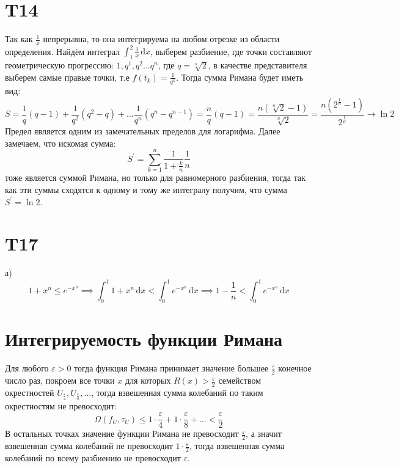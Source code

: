 \documentclass[12pt]{article}
\begin{document}
\section{T14}
Так как $\frac{1}{x}$ непрерывна, то она интегрируема на любом отрезке из области определения. 
Найдём интеграл $\int_{1}^{2} \frac{1}{x} \,\mathrm{d}x$, выберем разбиение, где точки 
составляют геометрическую прогрессию: $1, q^1, q^2 \dots q^n$, где $q = \sqrt[n]{2}$, 
в качестве представителя выберем самые правые точки, т.е $f(t_k) = \frac{1}{q^k}$. 
Тогда сумма Римана будет иметь вид: 
\[
    S = \frac{1}{q}(q - 1) + \frac{1}{q^2}(q^2 - q) + \dots \frac{1}{q^n}(q^n - q^{n-1}) = 
    \frac{n}{q}(q - 1) = \frac{n(\sqrt[n]{2} - 1)}{\sqrt[n]{2}} = \frac{n( 2^{\frac{1}{n}} - 1) }{2^{\frac{1}{n}}} \to \ln 2
\]   
Предел является одним из замечательных пределов для логарифма. Далее замечаем, что искомая сумма: 
\[
    S^{\prime}  = \sum_{k=1}^{n} \frac{1}{1 + \frac{k}{n}} \frac{1}{n}  
\]
тоже является суммой Римана, но только для равномерного разбиения, тогда так как эти суммы сходятся к одному и тому же 
интегралу получим, что сумма $S^{\prime} = \ln 2$. 
\section{T17}
а) 
\[
    1 + x^n \leq e^{-x^n} \implies \int_{0}^{1} 1 + x^n \,\mathrm{d}x  < \int_{0}^{1} e^{-x^n} \,\mathrm{d}x  \implies 1 - \frac{1}{n} < \int_{0}^{1} e^{-x^n} \,\mathrm{d}x
\]
\section{Интегрируемость функции Римана}
Для любого $\varepsilon > 0$ тогда функция Римана принимает значение большее $\frac{\varepsilon}{2}$ конечное число раз, 
покроем все точки $x$ для которых $R(x) > \frac{\varepsilon}{2}$ семейством окрестностей $U_{\frac{\varepsilon}{4}}, U_{\frac{\varepsilon}{8}}, \dots$, 
тогда взвешенная сумма колебаний по таким окрестностям не превосходит: 
\[
    \Omega(f_U, \tau_U) \leq 1\cdot\frac{\varepsilon}{4} + 1\cdot\frac{\varepsilon}{8} + \dots < \frac{\varepsilon}{2}
\]   
В остальных точках значение функции Римана не превосходит $\frac{\varepsilon}{2}$, а значит взвешенная сумма колебаний 
не превосходит $1\cdot\frac{\varepsilon}{2}$, тогда взвешенная сумма колебаний по всему разбиению не превосходит $\varepsilon$. 
\end{document}
